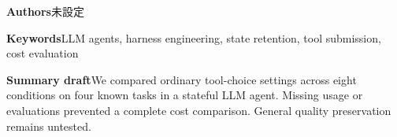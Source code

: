 \documentclass[uplatex,a4paper,twocolumn,10pt]{jsarticle}
\begin{document}
\noindent\textbf{Authors}\quad 未設定

\noindent\textbf{Keywords}\quad LLM agents, harness engineering, state retention, tool submission, cost evaluation

\noindent\textbf{Summary draft}\quad We compared ordinary tool-choice settings across eight conditions on four known tasks in a stateful LLM agent. Missing usage or evaluations prevented a complete cost comparison. General quality preservation remains untested.
\end{document}
